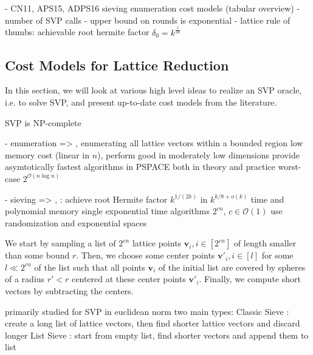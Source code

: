 



- CN11, APS15, ADPS16
sieving \cite{BDGL16, Laa15,ADPS16, APS15,BDGL16}
enumeration \cite{Kan87, MW15,FP85, CN11, APS15, HPSSWZ17}
cost models (tabular overview) \cite{ACCD+19}
- number of SVP calls \cite{ADPS16,Alb17}
- upper bound on rounds is exponential \cite{HPS11a, GN08b}
- lattice rule of thumbs: achievable root hermite factor $\delta_0 = k^{\frac{1}{2k}} $ %


\subsection{Cost Models for Lattice Reduction} \label{sec:costmodels}
In this section, we will look at various high level ideas to realize an SVP oracle, i.e. to solve SVP, and present up-to-date cost models from the literature. 

SVP is NP-complete %

- enumeration => \cite{ABFKSW20}, \cite{ABLR21}
enumerating all lattice vectors within a bounded region %
low memory cost (linear in $n$), perform good in moderately low dimensions
provide asymtotically fastest algorithms in PSPACE both in theory and practice %
worst-case $2^{\mathcal{O}(n \log n)}$


- sieving => \cite{ADHKPS19}, \cite{AGPS20}
  \cite{ABFKSW20}: achieve root Hermite factor $k^{1/(2k)}$ in $k^{k/8 + o(k)}$ time and polynomial memory
  single exponential time algorithms $2^{cn}$, $c \in \mathcal{O}(1)$ %
  use randomization and exponential spaces
    
  We start by sampling a list of $2^{cn}$ lattice points $\mathbf{v}_i, i \in [2^{cn}]$ of length smaller than some bound $r$. Then, we choose some center points $\mathbf{v}'_i, i \in [l]$ for some $l \ll 2^{cn}$ of the list such that all points $\mathbf{v}_i$ of the initial list are covered by spheres of a radius $r' < r$ centered at these center points $\mathbf{v}'_i$. Finally, we compute short vectors by subtracting the centers. 

  primarily studied for SVP in euclidean norm
  two main types: 
  Classic Sieve \cite{AKS01}: create a long list of lattice vectors, then find shorter lattice vectors and discard longer
  List Sieve \cite{MV10}: start from empty list, find shorter vectors and append them to list

